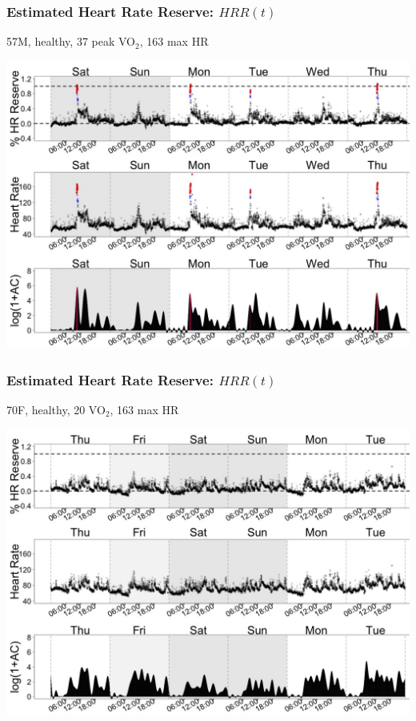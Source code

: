 \documentclass[10pt]{beamer}\usepackage[]{graphicx}\usepackage[]{color}
\begin{document}
\begin{frame}\frametitle{Estimated Heart Rate Reserve: $HRR(t)$}
57M, healthy, 37 peak VO$_2$, 163 max HR
\begin{center}
\includegraphics[width=\textwidth]{AC_HRR_HR_subj_4952}
\end{center}
\end{frame}

\begin{frame}\frametitle{Estimated Heart Rate Reserve: $HRR(t)$}
70F, healthy, 20 VO$_2$, 163 max HR
\begin{center}
\includegraphics[width=\textwidth]{AC_HRR_HR_subj_7774}
\end{center}
\end{frame}
\end{document}
